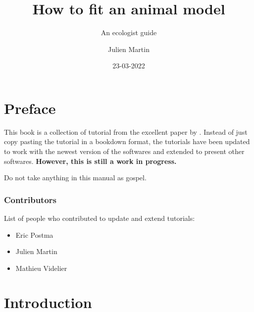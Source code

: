 \documentclass[
  12pt,
]{book}
\title{How to fit an animal model}
\subtitle{An ecologist guide}
\author{Julien Martin}
\date{23-03-2022}
\makeatletter
\providecommand{\tightlist}{%
  \setlength{\itemsep}{0pt}\setlength{\parskip}{0pt}}
\newenvironment{kframe}{%
\medskip{}
\setlength{\fboxsep}{.8em}
\def\at@end@of@kframe{}%
\ifinner\ifhmode%
 \def\at@end@of@kframe{\end{minipage}}%
 \begin{minipage}{\columnwidth}%
\fi\fi%
\def\FrameCommand##1{\hskip\@totalleftmargin \hskip-\fboxsep
\colorbox{incolor}{##1}\hskip-\fboxsep
    \hskip-\linewidth \hskip-\@totalleftmargin \hskip\columnwidth}%
\MakeFramed {\advance\hsize-\width
  \@totalleftmargin\z@ \linewidth\hsize
  \@setminipage}}%
{\par\unskip\endMakeFramed%
\at@end@of@kframe}
\newenvironment{rmdblock}[1]
 {
 \begin{itemize}
 \renewcommand{\labelitemi}{
   \raisebox{-.7\height}[0pt][0pt]{
     {\setkeys{Gin}{width=3em,keepaspectratio}\texttt{[image: images/\#1]}}
   }
 }
 \begin{kframe}
 \setlength{\fboxsep}{1em}
 \item
 }
 {
 \end{kframe}
 \end{itemize}
 }
\newenvironment{rmdwarning}
  {\begin{rmdblock}{warning}}
  {\end{rmdblock}}
\makeatother
\begin{document}
\maketitle



{
\setcounter{tocdepth}{1}
\tableofcontents
}
\hypertarget{preface}{%
\chapter*{Preface}\label{preface}}

This book is a collection of tutorial from the excellent paper by \citep{wilson2010}.
Instead of just copy pasting the tutorial in a bookdown format, the tutorials have been updated to work with the newest version of the softwares and extended to present other softwares.
\textbf{However, this is still a work in progress.}

\begin{rmdwarning}
Do not take anything in this manual as gospel.
\end{rmdwarning}

\hypertarget{contributors}{%
\subsection*{Contributors}\label{contributors}}

List of people who contributed to update and extend tutorials:

\begin{itemize}
\tightlist
\item
  Eric Postma
\item
  Julien Martin
\item
  Mathieu Videlier
\end{itemize}

\hypertarget{intro}{%
\chapter{Introduction}\label{intro}}
\end{document}

